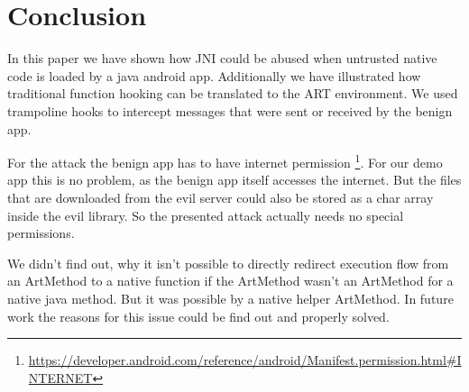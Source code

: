 
\section{Conclusion}

In this paper we have shown how JNI could be abused when untrusted native code is loaded by a java android app. Additionally we have illustrated how traditional function hooking can be translated to the ART environment. We used trampoline hooks to intercept messages that were sent or received by the benign app.

For the attack the benign app has to have internet permission \footnote{\url{https://developer.android.com/reference/android/Manifest.permission.html\#INTERNET}}. For our demo app this is no problem, as the benign app itself accesses the internet. But the files that are downloaded from the evil server could also be stored as a char array inside the evil library. So the presented attack actually needs no special permissions.

We didn't find out, why it isn't possible to directly redirect execution flow from an ArtMethod to a native function if the ArtMethod wasn't an ArtMethod for a native java method. But it was possible by a native helper ArtMethod. In future work the reasons for this issue could be find out and properly solved. 